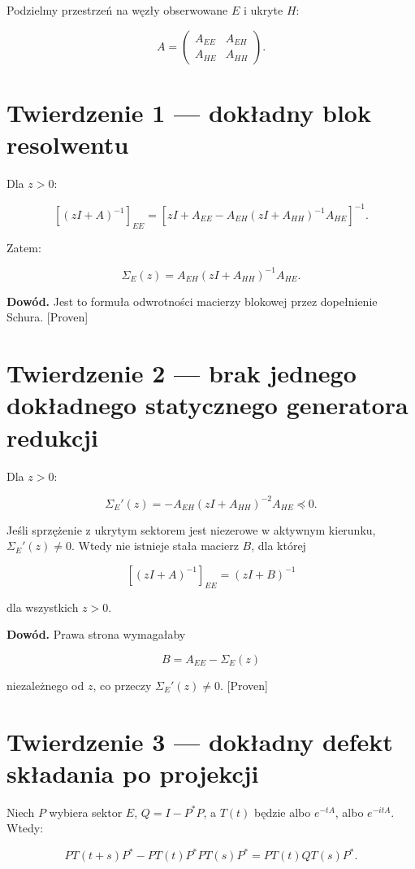 \documentclass[11pt,a4paper,openany]{report}
\newcommand{\statusProven}{\textcolor{fingreen}{[Proven]}}
\begin{document}
Podzielmy przestrzeń na węzły obserwowane \(E\) i ukryte \(H\):

\[
A=
\begin{pmatrix}
A_{EE}&A_{EH}\\
A_{HE}&A_{HH}
\end{pmatrix}.
\]

\section{Twierdzenie 1 --- dokładny blok resolwentu}

Dla \(z>0\):

\[
\left[(zI+A)^{-1}\right]_{EE}
=
\left[
zI+A_{EE}
-A_{EH}(zI+A_{HH})^{-1}A_{HE}
\right]^{-1}.
\]

Zatem:

\[
\Sigma_E(z)=A_{EH}(zI+A_{HH})^{-1}A_{HE}.
\]

\textbf{Dowód.} Jest to formuła odwrotności macierzy blokowej przez dopełnienie Schura. \statusProven{}

\section{Twierdzenie 2 --- brak jednego dokładnego statycznego generatora redukcji}

Dla \(z>0\):

\[
\Sigma_E'(z)
=
-A_{EH}(zI+A_{HH})^{-2}A_{HE}\preceq0.
\]

Jeśli sprzę\.zenie z ukrytym sektorem jest niezerowe w aktywnym kierunku, \(\Sigma_E'(z)\neq0\). Wtedy nie istnieje stała macierz \(B\), dla której

\[
\left[(zI+A)^{-1}\right]_{EE}=(zI+B)^{-1}
\]

dla wszystkich \(z>0\).

\textbf{Dowód.} Prawa strona wymagałaby

\[
B=A_{EE}-\Sigma_E(z)
\]

niezale\.znego od \(z\), co przeczy \(\Sigma_E'(z)\neq0\). \statusProven{}

\section{Twierdzenie 3 --- dokładny defekt składania po projekcji}

Niech \(P\) wybiera sektor \(E\), \(Q=I-P^\ast P\), a \(T(t)\) będzie albo \(e^{-tA}\), albo \(e^{-itA}\). Wtedy:

\[
PT(t+s)P^\ast
-PT(t)P^\ast PT(s)P^\ast
=
PT(t)QT(s)P^\ast.
\]
\end{document}
